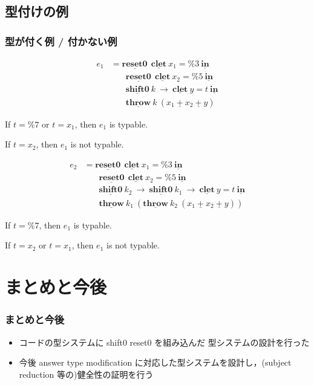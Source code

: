 \documentclass[dvipdfmx,cjk,xcolor=dvipsnames,envcountsect,notheorems,12pt]{beamer}
\newcommand\cResetz{\underline{\textbf{reset0}}}
\newcommand\cShiftz{\underline{\textbf{shift0}}}
\newcommand\cThrow{\underline{\textbf{throw}}}
\newcommand\cPlus{\underline{\textbf{+}}}
\newcommand\cLet{\underline{\textbf{clet}}}
\newcommand\cIn{\underline{\textbf{in}}}
\newcommand\csp[1]{\texttt{\%}{#1}}
\theoremstyle{definition}
\begin{document}
\subsection{型付けの例}
\begin{frame}
  \frametitle{型が付く例 / 付かない例}
  \begin{align*}
  e_1 & = \cResetz ~~\cLet~x_1=\csp{3}~\cIn \\
      & \phantom{=}~~ \cResetz ~~\cLet~x_2=\csp{5}~\cIn \\
      & \phantom{=}~~ \cShiftz~k~\to~\cLet~y=t~\cIn \\
      & \phantom{=}~~ \cThrow~k~(x_1~\cPlus~x_2~\cPlus~y)
\end{align*}

If $t=\csp{7}$ or $t=x_1$, then $e_1$ is typable.

If $t=x_2$, then $e_1$ is not typable.

\begin{align*}
  e_2 & = \cResetz ~~\cLet~x_1=\csp{3}~\cIn \\
      & \phantom{=}~~ \cResetz ~~\cLet~x_2=\csp{5}~\cIn \\
      & \phantom{=}~~ \cShiftz~k_2~\to~ \cShiftz~k_1~\to~ \cLet~y=t~\cIn \\
      & \phantom{=}~~ \cThrow~k_1~(\cThrow~k_2~(x_1~\cPlus~x_2~\cPlus~y))
\end{align*}

If $t=\csp{7}$, then $e_1$ is typable.

If $t=x_2$ or $t=x_1$, then $e_1$ is not typable.
\end{frame}

\section{まとめと今後}
\begin{frame}
  \frametitle{まとめと今後}
  \begin{itemize}
  \item コードの型システムに shift0 reset0 を組み込んだ 型システムの設計を行った
  \item 今後 answer type modification に対応した型システムを設計し，(subject reduction 等の)健全性の証明を行う
  \end{itemize}
\end{frame}
\end{document}
